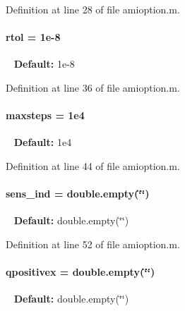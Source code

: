 Definition at line 28 of file amioption.\+m.

\hypertarget{classamioption_a7978e9a4674f869e6b2950e2f6262ca5}{}
\paragraph[{rtol}]{\setlength{\rightskip}{0pt plus 5cm}rtol = 1e-\/8}\label{classamioption_a7978e9a4674f869e6b2950e2f6262ca5}
~\newline
{\bfseries Default\+:} 1e-\/8 

Definition at line 36 of file amioption.\+m.

\hypertarget{classamioption_ac37622882dacee1f11688d4941ccb45e}{}
\paragraph[{maxsteps}]{\setlength{\rightskip}{0pt plus 5cm}maxsteps = 1e4}\label{classamioption_ac37622882dacee1f11688d4941ccb45e}
~\newline
{\bfseries Default\+:} 1e4 

Definition at line 44 of file amioption.\+m.

\hypertarget{classamioption_a0505783cf66f362672cbe3320d47a94d}{}
\paragraph[{sens\+\_\+ind}]{\setlength{\rightskip}{0pt plus 5cm}sens\+\_\+ind = double.\+empty(\char`\"{}\char`\"{})}\label{classamioption_a0505783cf66f362672cbe3320d47a94d}
~\newline
{\bfseries Default\+:} double.\+empty(\char`\"{}\char`\"{}) 

Definition at line 52 of file amioption.\+m.

\hypertarget{classamioption_a8938c19fd7067f4780be8255764210b7}{}
\paragraph[{qpositivex}]{\setlength{\rightskip}{0pt plus 5cm}qpositivex = double.\+empty(\char`\"{}\char`\"{})}\label{classamioption_a8938c19fd7067f4780be8255764210b7}
~\newline
{\bfseries Default\+:} double.\+empty(\char`\"{}\char`\"{}) 

